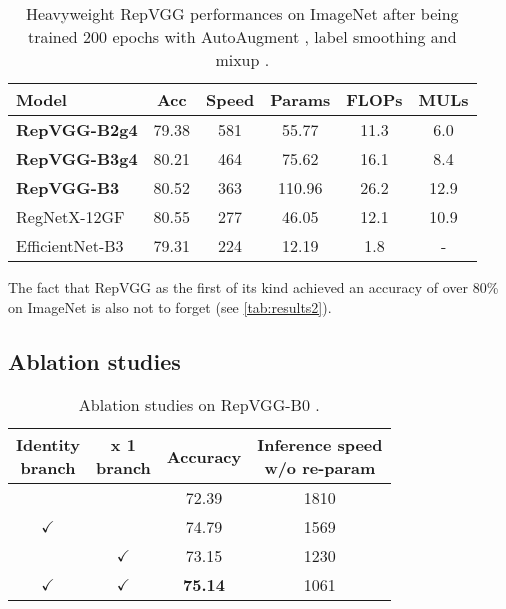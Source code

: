 \setlength{\tabcolsep}{3pt}
\begin{table}
	\begin{center}
		\begin{tabular}{lccccc} 
			\hline
			Model & Acc & Speed & Params & FLOPs & MULs \\
			\hline
			\textbf{RepVGG-B2g4} & 79.38 & 581 & 55.77 & 11.3 & 6.0 \\
			\textbf{RepVGG-B3g4} & 80.21 & 464 & 75.62 & 16.1 & 8.4 \\
			\textbf{RepVGG-B3} & 80.52 & 363 & 110.96 & 26.2 & 12.9 \\
			RegNetX-12GF & 80.55 & 277 & 46.05 & 12.1 & 10.9 \\
			EfficientNet-B3 & 79.31 & 224 & 12.19 & 1.8 & - \\
			\hline
		\end{tabular}
	\end{center}
	\caption{Heavyweight RepVGG performances on ImageNet \cite{JiaDeng.2009} after being trained 200 epochs with AutoAugment \cite{EkinDCubuk.2019}, label smoothing \cite{ChristianSzegedy.2015} and mixup \cite{HongyiZhang.2018} \cite{XiaohanDing.2021}.}
	\label{tab:results2}
\end{table}
\setlength{\tabcolsep}{6pt}

The fact that RepVGG as the first of its kind achieved an accuracy of over 80\% on ImageNet \cite{JiaDeng.2009} is also not to forget (see \autoref{tab:results2}).

\subsection{Ablation studies}

\begin{table}
	\begin{center}
		\begin{tabular}{cccc} 
			\hline
			\parbox[c][1cm]{1cm}{\centering Identity\\branch} & \parbox[c][1cm]{1cm}{ x 1\\branch} & \parbox[c][1cm]{1cm}{\centering Accuracy} & \parbox[c][1cm]{3cm}{\centering Inference speed\\w/o re-param} \\
			\hline
			 & & 72.39 & 1810 \\
			$\checkmark$ & & 74.79 & 1569 \\
			 & $\checkmark$ & 73.15 & 1230 \\
			$\checkmark$ & $\checkmark$ & \textbf{75.14} & 1061 \\
			\hline
		\end{tabular}
	\end{center}
	\caption{Ablation studies on RepVGG-B0 \cite{XiaohanDing.2021}.}
	\label{tab:ablation1}
\end{table}

